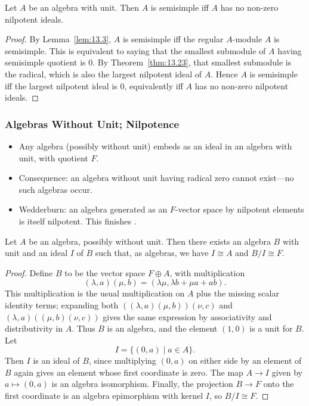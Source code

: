 \documentclass[../Odyssey_Project.tex]{subfiles}
\begin{document}
\begin{corollary}
\label{cor:13.24}
Let $A$ be an algebra with unit. Then $A$ is semisimple iff $A$ has no non-zero nilpotent ideals.
\end{corollary}
\begin{proof}
    By Lemma~\ref{lem:13.3}, $A$ is semisimple iff the regular $A$-module $A$ is semisimple. This is equivalent to saying that the smallest submodule of $A$ having semisimple quotient is $0$. By Theorem~\ref{thm:13.23}, that smallest submodule is the radical, which is also the largest nilpotent ideal of $A$. Hence $A$ is semisimple iff the largest nilpotent ideal is $0$, equivalently iff $A$ has no non-zero nilpotent ideals.
\end{proof}

\subsubsection*{Algebras Without Unit; Nilpotence}
\begin{itemize}
    \item Any algebra (possibly without unit) embeds as an ideal in an algebra with unit, with quotient $F$.
    \item Consequence: an algebra without unit having radical zero cannot exist---no such algebras occur.
    \item Wedderburn: an algebra generated as an $F$-vector space by nilpotent elements is itself nilpotent. This finishes .
\end{itemize}

\begin{lemma}
\label{lem:13.25}
Let $A$ be an algebra, possibly without unit. Then there exists an algebra $B$ with unit and an ideal $I$ of $B$ such that, as algebras, we have $I \cong A$ and $B/I \cong F$.
\end{lemma}
\begin{proof}
    Define $B$ to be the vector space $F \oplus A$, with multiplication
    \[
        (\lambda,a)(\mu,b) = (\lambda\mu,\lambda b+\mu a+ab).
    \]
    This multiplication is the usual multiplication on $A$ plus the missing scalar identity terms; expanding both $((\lambda,a)(\mu,b))(\nu,c)$ and $(\lambda,a)((\mu,b)(\nu,c))$ gives the same expression by associativity and distributivity in $A$. Thus $B$ is an algebra, and the element $(1,0)$ is a unit for $B$. Let
    \[
        I = \{(0,a) \mid a \in A\}.
    \]
    Then $I$ is an ideal of $B$, since multiplying $(0,a)$ on either side by an element of $B$ again gives an element whose first coordinate is zero. The map $A \to I$ given by $a \mapsto (0,a)$ is an algebra isomorphism. Finally, the projection $B \to F$ onto the first coordinate is an algebra epimorphism with kernel $I$, so $B/I \cong F$.
\end{proof}
\end{document}
